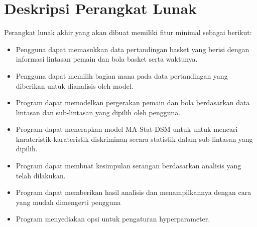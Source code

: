 \documentclass[a4paper,twoside]{article}
\begin{document}
	\section{Deskripsi Perangkat Lunak}
	
	Perangkat lunak akhir yang akan dibuat memiliki fitur minimal sebagai berikut:

	\begin{itemize}
		\item Pengguna dapat memasukkan data pertandingan basket yang berisi dengan informasi lintasan pemain dan bola basket serta waktunya.
		\item Pengguna dapat memilih bagian mana pada data pertandingan yang diberikan untuk dianalisis oleh model.
		\item Program dapat memodelkan pergerakan pemain dan bola berdasarkan data lintasan dan sub-lintasan yang dipilih oleh pengguna.
		\item Program dapat menerapkan model MA-Stat-DSM untuk untuk mencari karateristik-karateristik diskriminan secara statistik dalam sub-lintasan yang dipilih.
		\item Program dapat membuat kesimpulan serangan berdasarkan analisis yang telah dilakukan.
		\item Program dapat memberikan hasil analisis dan menampilkannya dengan cara yang mudah dimengerti pengguna
		\item Program menyediakan opsi untuk pengaturan hyperparameter. 
	\end{itemize}
	
\end{document}
